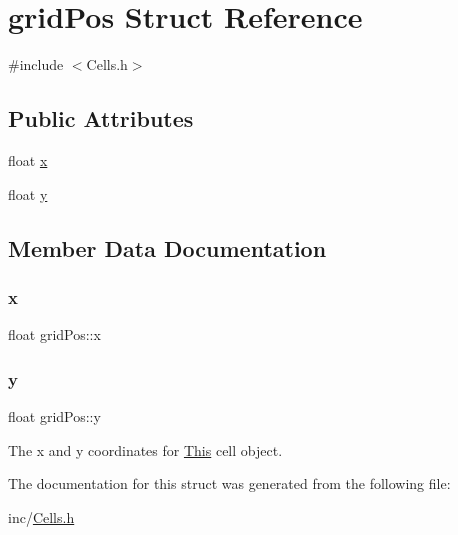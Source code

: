 \hypertarget{structgrid_pos}{}\section{grid\+Pos Struct Reference}
\label{structgrid_pos}


{\ttfamily \#include $<$Cells.\+h$>$}

\subsection*{Public Attributes}
\begin{DoxyCompactItemize}
\item 
float \mbox{\hyperlink{structgrid_pos_a582a1c50bb78a8460a4820ed010e60e4}{x}}
\item 
float \mbox{\hyperlink{structgrid_pos_a3e6999820e3185735de6d91e3c01da22}{y}}
\end{DoxyCompactItemize}


\subsection{Member Data Documentation}
\mbox{\label{structgrid_pos_a582a1c50bb78a8460a4820ed010e60e4}} 
\subsubsection{\texorpdfstring{x}{x}}
{\footnotesize\ttfamily float grid\+Pos\+::x}

\mbox{\label{structgrid_pos_a3e6999820e3185735de6d91e3c01da22}} 
\subsubsection{\texorpdfstring{y}{y}}
{\footnotesize\ttfamily float grid\+Pos\+::y}

The x and y coordinates for \mbox{\hyperlink{class_this}{This}} cell object. 

The documentation for this struct was generated from the following file\+:\begin{DoxyCompactItemize}
\item 
inc/\mbox{\hyperlink{_cells_8h}{Cells.\+h}}\end{DoxyCompactItemize}

